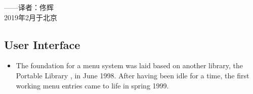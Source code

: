 \medskip
\begin{flushright}
——译者：佟辉\\
2019年2月于北京
\end{flushright}


\fi
\iffalse
\subsection{User Interface}
\begin{itemize}
\item The foundation for a menu system was laid based on another library,
 the Portable Library \PLIB{}, in June 1998. After having been idle for a time, the first working menu entries came to life in spring 1999.


\end{itemize}
